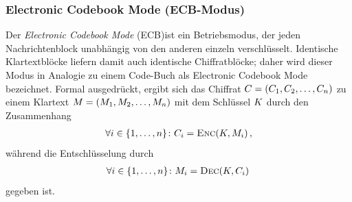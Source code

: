 \subsubsection{Electronic Codebook Mode (ECB-Modus)}\label{sssec:ecb}
Der \emph{Electronic Codebook Mode} (ECB)\indexECB ist ein
Betriebsmodus, der jeden Nachrichtenblock unabhängig von den anderen
einzeln verschlüsselt. Identische Klartextblöcke liefern damit auch
identische Chiffratblöcke; daher wird dieser Modus in Analogie zu einem
Code-Buch als Electronic Codebook Mode bezeichnet. Formal ausgedrückt,
ergibt sich das Chiffrat $C =
(C_{1},C_{2},\dots,C_{n})$ zu einem Klartext
$M = (M_{1},M_{2},\dots,M_{n})$ mit dem
Schlüssel $K$ durch den Zusammenhang 
\begin{align*}
  \forall i \in \{1,\dots,n\}\colon C_{i} = \textsc{Enc}(K,M_{i})\, ,
\end{align*}
während die Entschlüsselung durch
\begin{align*}
  \forall i \in \{1,\dots,n\}\colon M_{i} = \textsc{Dec}(K,C_{i})\, 
\end{align*}
gegeben ist.
